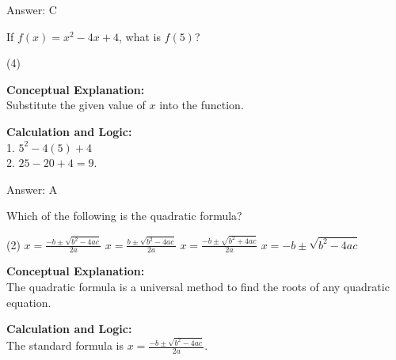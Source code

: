 \documentclass[11pt,paper=a4,answers]{exam}
\begin{document}
\begin{questions}
\begin{solution}
\vspace{20pt}

Answer: \colorbox{yellow!100}{C}
\end{solution}

\vspace{30pt}

\question
If $f(x) = x^2 - 4x + 4$, what is $f(5)$?
\begin{tasks}(4)
\end{tasks}

\begin{solution}
\textbf{Conceptual Explanation:} \\
Substitute the given value of $x$ into the function.

\vspace{15pt}

\textbf{Calculation and Logic:} \\
1. $5^2 - 4(5) + 4$ \\
2. $25 - 20 + 4 = 9$.

\vspace{20pt}

Answer: \colorbox{yellow!100}{A}
\end{solution}

\vspace{30pt}

\question
Which of the following is the quadratic formula?
\begin{tasks}(2)
    \task $x = \frac{-b \pm \sqrt{b^2 - 4ac}}{2a}$
    \task $x = \frac{b \pm \sqrt{b^2 - 4ac}}{2a}$
    \task $x = \frac{-b \pm \sqrt{b^2 + 4ac}}{2a}$
    \task $x = -b \pm \sqrt{b^2 - 4ac}$
\end{tasks}

\begin{solution}
\textbf{Conceptual Explanation:} \\
The quadratic formula is a universal method to find the roots of any quadratic equation.

\vspace{15pt}

\textbf{Calculation and Logic:} \\
The standard formula is $x = \frac{-b \pm \sqrt{b^2 - 4ac}}{2a}$.

\vspace{20pt}


\end{solution}
\end{questions}
\end{document}
